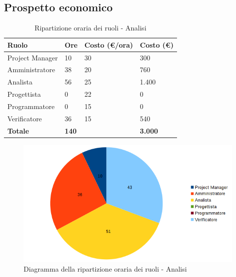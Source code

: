 \documentclass[12pt,a4paper]{article}
\begin{document}
\newpage
\subsection{Prospetto economico}

\begin{table}[h]
\begin{center}
\begin{tabular}{p{} p{} p{} p{}}
\toprule
\textbf{Ruolo}	& \textbf{Ore} & \textbf{Costo (\euro/ora)}	& \textbf{Costo (\euro)} \\
\midrule
\midrule
Project Manager & 10 & 30 & 300\\
\midrule
Amministratore & 38 & 20 & 760\\ 
\midrule
Analista & 56 & 25 & 1.400\\ 
\midrule
Progettista & 0 & 22 & 0\\ 
\midrule
Programmatore & 0 & 15 & 0\\ 
\midrule
Verificatore & 36 & 15 & 540\\ 
\midrule
\textbf{Totale} & \textbf{140} &  & \textbf{3.000}\\
\bottomrule
\end{tabular}
\caption{Ripartizione oraria dei ruoli - Analisi}
\end{center}
\end{table}

\begin{center}
\begin{figure}[h]
\centering
\includegraphics[width=\textwidth]{diagrammaTortaAnalisiTotaleOre.png}
\caption{Diagramma della ripartizione oraria dei ruoli - Analisi}
\end{figure}
\end{center}

\newpage
\end{document}
